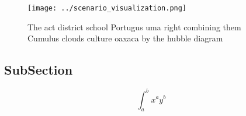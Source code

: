 \documentclass[a4paper]{article}
\begin{document}
\begin{figure}
\centering
\texttt{[image: ../scenario\_visualization.png]}
\caption{The act district school Portugus uma right combining them Cumulus clouds culture oaxaca by the hubble diagram
}
\end{figure}
 
\subsection{SubSection}

\[ \int_{a}^{b}{x^{a}y^{b}} \]
\end{document}

